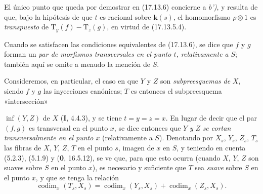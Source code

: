 El único punto que queda por demostrar en (17.13.6) concierne a \emph{b')}, y resulta de que, bajo la hipótesis de que $t$ es racional sobre $\boldsymbol{k}(s)$, el homomorfismo $\rho\otimes1$ es \emph{transpuesto} de $\mathrm{T}_y(f)-\mathrm{T}_z(g)$, en virtud de (17.13.5.4).

Cuando se satisfacen las condiciones equivalentes de (17.13.6), se dice que $f$ y $g$ forman un \emph{par de morfismos transversales en el punto $t$, relativamente a} $S$; también aquí se omite a menudo la mención de $S$.

\begin{env}[17.13.7]
\label{IV.17.13.7}
Consideremos, en particular, el caso en que $Y$ y $Z$ son \emph{subpreesquemas de} $X$, siendo $f$ y $g$ las inyecciones canónicas; $T$ es entonces el subpreesquema «intersección»


$\inf(Y,Z)$ de $X$ (\textbf I, 4.4.3), y se tiene $t=y=z=x$. En lugar de decir que el par $(f,g)$ es transversal en el punto $x$, se dice entonces que $Y$ \emph{y} $Z$ \emph{se cortan transversalmente en el punto $x$} (relativamente a $S$). Denotando por $X_s$, $Y_s$, $Z_s$, $T_s$ las fibras de $X$, $Y$, $Z$, $T$ en el punto $s$, imagen de $x$ en $S$, y teniendo en cuenta (5.2.3), (5.1.9) y (\textbf 0, 16.5.12), se ve que, para que esto ocurra (cuando $X$, $Y$, $Z$ son suaves sobre $S$ en el punto $x$), es necesario y suficiente que $T$ sea \emph{suave} sobre $S$ en el punto $x$, y que se tenga la relación
\[
\label{IV.17.13.7.1}
\tag{17.13.7.1}
\operatorname{codim}_x(T_s,X_s)=\operatorname{codim}_x(Y_s,X_s)+\operatorname{codim}_x(Z_s,X_s).
\]
\end{env}

